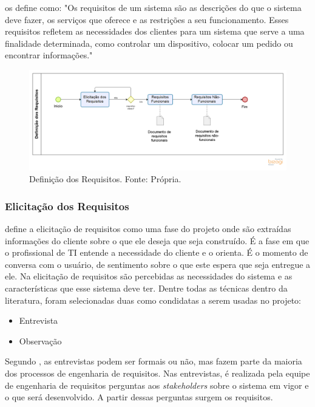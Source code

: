  os define como: "Os requisitos de um sistema são as descrições do que o sistema deve fazer, os serviços que oferece e as restrições a seu funcionamento. Esses requisitos refletem as necessidades dos clientes para um sistema que serve a uma finalidade determinada, como controlar um dispositivo, colocar um pedido ou encontrar informações."

\begin{figure}[H]
	\centering
	\includegraphics[width=1.0\textwidth]{figuras/elicitacaoDosRequisitos.png}
	\caption{Definição dos Requisitos. Fonte: Própria.}
	\label{img:definicao_requisitos}
\end{figure}

\subsubsection{Elicitação dos Requisitos}
\label{sec:elicitacao_requisitos}

 define a elicitação de requisitos como uma fase do projeto onde são extraídas informações do cliente sobre o que ele deseja que seja construído. É a fase em que o profissional de TI entende a necessidade do cliente e o orienta. É o momento de conversa com o usuário, de sentimento sobre o que este espera que seja entregue a ele. Na elicitação de requisitos são percebidas as necessidades do sistema e as características que esse sistema deve ter. Dentre todas as técnicas dentro da literatura, foram selecionadas duas como condidatas a serem usadas no projeto:

\begin{itemize}
    \item Entrevista
    \item Observação
\end{itemize}

\label{sec:entrevista}

Segundo , as entrevistas podem ser formais ou não, mas fazem parte da maioria dos processos de engenharia de requisitos. Nas entrevistas, é realizada pela equipe de engenharia de requisitos perguntas aos \textit{stakeholders} sobre o sistema em vigor e o que será desenvolvido. A partir dessas perguntas surgem os requisitos.

